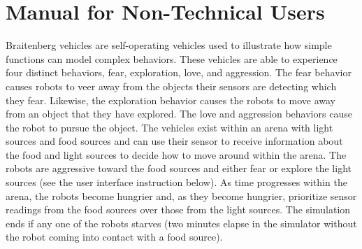 \hypertarget{index_User}{}\section{Manual for Non-\/\+Technical Users}\label{index_User}
Braitenberg vehicles are self-\/operating vehicles used to illustrate how simple functions can model complex behaviors. These vehicles are able to experience four distinct behaviors, fear, exploration, love, and aggression. The fear behavior causes robots to veer away from the objects their sensors are detecting which they fear. Likewise, the exploration behavior causes the robots to move away from an object that they have explored. The love and aggression behaviors cause the robot to pursue the object. The vehicles exist within an arena with light sources and food sources and can use their sensor to receive information about the food and light sources to decide how to move around within the arena. The robots are aggressive toward the food sources and either fear or explore the light sources (see the user interface instruction below). As time progresses within the arena, the robots become hungrier and, as they become hungrier, prioritize sensor readings from the food sources over those from the light sources. The simulation ends if any one of the robots starves (two minutes elapse in the simulator without the robot coming into contact with a food source).

